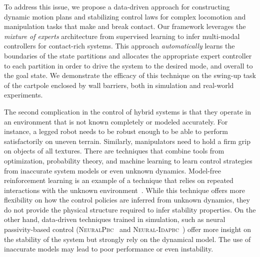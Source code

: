 To address this issue, we propose a data-driven approach for constructing
dynamic motion plans and stabilizing control laws for complex locomotion and
manipulation tasks that make and break contact.
%
Our framework leverages the \textit{mixture of experts} architecture from
supervised learning to infer multi-modal controllers for contact-rich systems.
% 
This approach \textit{automatically} learns the boundaries of the state
partitions and allocates the appropriate expert controller to each partition in
order to drive the system to the desired mode, and overall to the goal state.
%
We demonstrate the efficacy of this technique on the swing-up task of the
cartpole enclosed by wall barriers, both in simulation and real-world
experiments.

The second complication in the control of hybrid systems is that they operate in
an environment that is not known completely or modeled accurately.
%
For instance, a legged robot needs to be robust enough to be able to perform
satisfactorily on uneven terrain. Similarly, manipulators need to hold a firm
grip on objects of all textures.
%
There are techniques that combine tools from optimization, probability theory,
and machine learning to learn control strategies from inaccurate system models
or even unknown dynamics.
%
Model-free reinforcement learning is an example of a technique that relies on
repeated interactions with the unknown
environment~\cite{heess2017emergence,andrychowicz2020learning,lillicrap2015continuous}.
%
While this technique offers more flexibility on how the control policies are
inferred from unknown dynamics, they do not provide the physical structure
required to infer stability properties.
%
On the other hand, data-driven techniques trained in simulation, such as neural
passivity-based control (\textsc{NeuralPbc}~\cite{ashenafi2022robust} and
\textsc{Neural-Idapbc}~\cite{sirichotiyakul2022data}) offer more insight on the
stability of the system but strongly rely on the dynamical model.
%
The use of inaccurate models may lead to poor performance or even instability.
%

